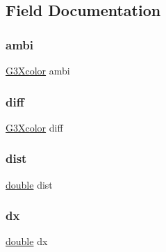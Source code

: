 \subsection{Field Documentation}
\mbox{\label{struct_g3_xlight_a2f38453a2432f73c432d6d6c71cf630d}} 
\subsubsection{\texorpdfstring{ambi}{ambi}}
{\footnotesize\ttfamily \hyperlink{g3x__types_8h_afc484f732c62f1a0417034e535352e30}{G3\+Xcolor} ambi}

\mbox{\label{struct_g3_xlight_ab37a07844bff7802809eb22db0fb0b16}} 
\subsubsection{\texorpdfstring{diff}{diff}}
{\footnotesize\ttfamily \hyperlink{g3x__types_8h_afc484f732c62f1a0417034e535352e30}{G3\+Xcolor} diff}

\mbox{\label{struct_g3_xlight_accf93555161c9eedf006462a228af523}} 
\subsubsection{\texorpdfstring{dist}{dist}}
{\footnotesize\ttfamily \hyperlink{g3x__transfo_8h_a89b2b23e407882a535d835574a7912e1}{double} dist}

\mbox{\label{struct_g3_xlight_a229d11aff11a7482259d1296b9b70b8a}} 
\subsubsection{\texorpdfstring{dx}{dx}}
{\footnotesize\ttfamily \hyperlink{g3x__transfo_8h_a89b2b23e407882a535d835574a7912e1}{double} dx}

\mbox{\label{struct_g3_xlight_a9deb6f886b19d50e714d890c3c268efc}} 
